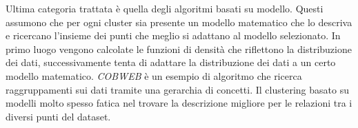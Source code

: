 Ultima categoria trattata è quella degli algoritmi basati su modello.
Questi assumono
che per ogni cluster sia presente un modello matematico che lo descriva e ricercano l'insieme dei punti che meglio si adattano
al modello selezionato.
In primo luogo vengono calcolate le funzioni di densità che riflettono la distribuzione dei dati,
successivamente tenta di adattare la distribuzione dei dati a un certo modello matematico. \textit{COBWEB}\cite{fisher1987knowledge} è
un esempio di algoritmo che ricerca raggruppamenti sui dati tramite una gerarchia di concetti.
Il clustering basato su modelli molto spesso fatica nel trovare la descrizione migliore per le relazioni tra i diversi punti del dataset.





